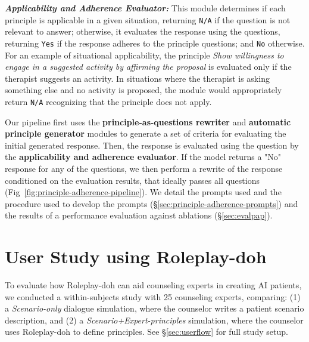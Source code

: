 \documentclass[11pt]{article}
\begin{document}
\textbf{\textit{Applicability and Adherence Evaluator:}} %
This module determines if each principle is applicable in a given situation, returning \texttt{N/A} if the question is not relevant to answer; otherwise, it evaluates the response using the questions, returning \texttt{Yes} if the response adheres to the principle questions; and \texttt{No} otherwise. For an example of situational applicability, the principle \textit{Show willingness to engage in a suggested activity by affirming the proposal} is evaluated only if the therapist suggests an activity. In situations where the therapist is asking something else and no activity is proposed, the module would appropriately return \texttt{N/A} recognizing that the principle does not apply.

Our pipeline first uses the \textbf{principle-as-questions rewriter} and \textbf{automatic principle generator} modules to generate a set of criteria for evaluating the initial generated response. Then, the response is evaluated using the question by the \textbf{applicability and adherence evaluator}. If the model returns a "No" response for any of the questions, we then perform a rewrite of the response conditioned on the evaluation results, that ideally passes all questions (Fig~\ref{fig:principle-adherence-pipeline}). We detail the prompts used and the procedure used to develop the prompts (\S\ref{sec:principle-adherence-prompts}) and the results of a performance evaluation against ablations (\S\ref{sec:evalpap}). 
\vspace{-0.05in}
\section{User Study using Roleplay-doh}\vspace{-0.05in}
To evaluate how Roleplay-doh can aid counseling experts in creating AI patients, we conducted a within-subjects study with 25 counseling experts, comparing: (1) a \emph{Scenario-only} dialogue simulation, where the counselor writes a patient scenario description, and (2) a \emph{Scenario+Expert-principles} simulation, where the counselor uses Roleplay-doh to define principles. See \S\ref{sec:userflow} for full study setup.
\end{document}

